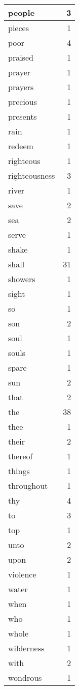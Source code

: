 \begin{center}
\begin{longtable}{l|r}
people & 3\\ \hline 
pieces & 1\\ \hline 
poor & 4\\ \hline 
praised & 1\\ \hline 
prayer & 1\\ \hline 
prayers & 1\\ \hline 
precious & 1\\ \hline 
presents & 1\\ \hline 
rain & 1\\ \hline 
redeem & 1\\ \hline 
righteous & 1\\ \hline 
righteousness & 3\\ \hline 
river & 1\\ \hline 
save & 2\\ \hline 
sea & 2\\ \hline 
serve & 1\\ \hline 
shake & 1\\ \hline 
shall & 31\\ \hline 
showers & 1\\ \hline 
sight & 1\\ \hline 
so & 1\\ \hline 
son & 2\\ \hline 
soul & 1\\ \hline 
souls & 1\\ \hline 
spare & 1\\ \hline 
sun & 2\\ \hline 
that & 2\\ \hline 
the & 38\\ \hline 
thee & 1\\ \hline 
their & 2\\ \hline 
thereof & 1\\ \hline 
things & 1\\ \hline 
throughout & 1\\ \hline 
thy & 4\\ \hline 
to & 3\\ \hline 
top & 1\\ \hline 
unto & 2\\ \hline 
upon & 2\\ \hline 
violence & 1\\ \hline 
water & 1\\ \hline 
when & 1\\ \hline 
who & 1\\ \hline 
whole & 1\\ \hline 
wilderness & 1\\ \hline 
with & 2\\ \hline 
wondrous & 1\\ \hline 
\end{longtable}
\end{center}



